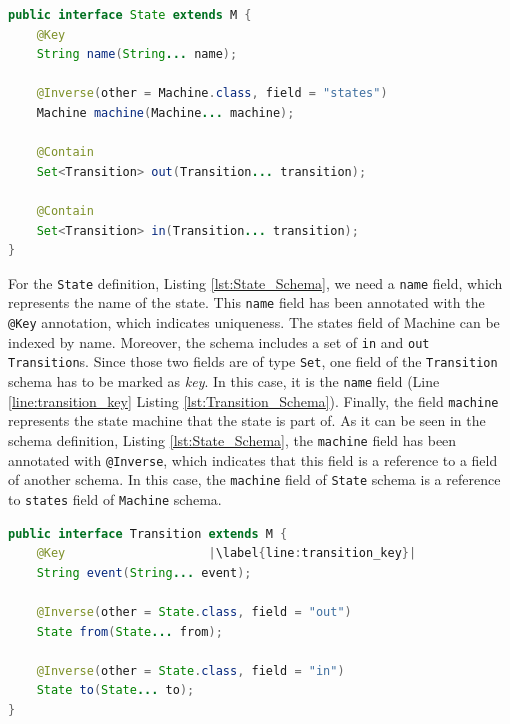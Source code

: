 \begin{sourcecode}[H]
	\begin{lstlisting}[language=Java,escapechar=|]
public interface State extends M {
	@Key
	String name(String... name);

	@Inverse(other = Machine.class, field = "states")
	Machine machine(Machine... machine);

	@Contain
	Set<Transition> out(Transition... transition);

	@Contain
	Set<Transition> in(Transition... transition);
}
	\end{lstlisting}
	\caption{The State Schema}
	\label{lst:State_Schema}
\end{sourcecode}

For the \texttt{State} definition, Listing \ref{lst:State_Schema}, we need a \texttt{name} field, which represents the name of the state. 
This \texttt{name} field has been annotated with the \texttt{@Key} annotation, which indicates uniqueness. 
The states field of Machine can be indexed by name.
Moreover, the schema includes a set of \texttt{in} and \texttt{out} \texttt{Transition}s.
Since those two fields are of type \texttt{Set}, one field of the \texttt{Transition} schema has to be marked as \textit{key}.
In this case, it is the \texttt{name} field (Line \ref{line:transition_key} Listing \ref{lst:Transition_Schema}).
Finally, the field \texttt{machine} represents the state machine that the state is part of. 
As it can be seen in the schema definition, Listing \ref{lst:State_Schema}, the \texttt{machine} field has been annotated with \texttt{@Inverse}, which indicates that this field is a reference to a field of another schema.
In this case, the \texttt{machine} field of \texttt{State} schema is a reference to \texttt{states} field of \texttt{Machine} schema.

\begin{sourcecode}[H]
	\begin{lstlisting}[language=Java,escapechar=|]
public interface Transition extends M {
	@Key 					|\label{line:transition_key}| 
	String event(String... event);

	@Inverse(other = State.class, field = "out")
	State from(State... from);

	@Inverse(other = State.class, field = "in")
	State to(State... to);
}
	\end{lstlisting}
	\caption{The Transition Schema}
	\label{lst:Transition_Schema}
\end{sourcecode}

